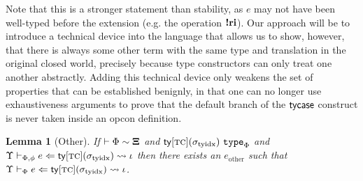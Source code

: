 \documentclass[9pt,preprint]{sigplanconf}
\newtheorem{lemma}{Lemma}
\begin{document}
Note that this is a stronger statement than stability, as $e$ may not have been well-typed before the extension (e.g. the operation $\textbf{!ri}$). Our approach will be to introduce a technical device into the language that allows us to show, however, that there is always some other term with the same type and translation in the original closed world, precisely because  type constructors can only treat one another abstractly. Adding this technical device only weakens the set of properties that can be established benignly, in that one can no longer use exhaustiveness arguments to prove that the default branch of the ${\sf tycase}$ construct is never taken inside an opcon definition. 

\begin{lemma}[Other]
If $\vdash \Phi \sim \boldsymbol\Xi$ and ${\sf ty}[\textsc{tc}](\sigma_\text{tyidx})~\mathtt{type}_{\Phi}$ and $\Upsilon \vdash_{\Phi, \phi} e \Leftarrow {\sf ty}[\textsc{tc}](\sigma_\text{tyidx}) \leadsto \iota$ then there exists an $e_\text{other}$ such that $\Upsilon \vdash_{\Phi} e \Leftarrow {\sf ty}[\textsc{tc}](\sigma_\text{tyidx}) \leadsto \iota$.
\end{lemma}
\end{document}
